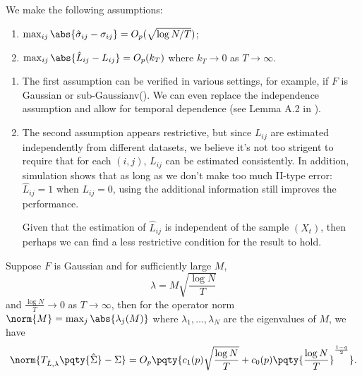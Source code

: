 \begin{asmp}\label{asmp:1}
    We make the following assumptions:
    \begin{enumerate}
        \item \(\max_{ij} \abs{\hat{\sigma}_{ij} - \sigma_{ij}} = O_{p}(\sqrt{\log N / T})\);
        \item \(\max_{ij} \abs{\hat{L}_{ij} - L_{ij}} = O_{p}(k_{T})\) where \(k_{T} \to 0\) as \(T \to \infty\).
    \end{enumerate}
\end{asmp}
\begin{remark}
    \begin{enumerate}
        \item 
        The first assumption can be verified in various settings, for example, if \(F\) is Gaussian or sub-Gaussianv(\cite{cai2011AdaptiveThresholding}). We can even replace the independence assumption and allow for temporal dependence (see Lemma A.2 in \cite{shu2019EstimationLarge}). 
        \item The second assumption appears restrictive, but since \(L_{ij}\) are estimated independently from different datasets, we believe it's not too strigent to require that for each \((i,j)\), \(L_{ij}\) can be estimated consistently. In addition, simulation shows that as long as we don't make too much II-type error: \(\hat{L}_{ij} = 1\) when \(L_{ij} = 0\), using the additional information still improves the performance. 
        
        Given that the estimation of \(\hat{L}_{ij}\) is independent of the sample \((X_{t})\), then perhaps we can find a less restrictive condition for the result to hold.
    \end{enumerate}
\end{remark}


\begin{thm}
    Suppose \(F\) is Gaussian and for sufficiently large \(M\), 
    \begin{equation*}
        \lambda = M \sqrt{\frac{\log N}{T}}
    \end{equation*}
    and \(\frac{\log N}{T} \to 0\) as \(T \to \infty\), 
    then for the operator norm \(\norm{M}= \max_{j} \abs{\lambda_{j}(M)}\) where \(\lambda_{1},\dots,\lambda_{N}\) are the eigenvalues of \(M\), we have 
    \begin{equation*}
        \norm{T_{\hat{L},\lambda}\pqty{\hat{\Sigma}} - \Sigma } = O_{p}\pqty{c_{1}(p) \sqrt{\frac{\log N}{T}}+c_{0}(p)\pqty{\frac{\log N}{T}}^{\frac{1-q}{2}}}. 
    \end{equation*}
\end{thm}

